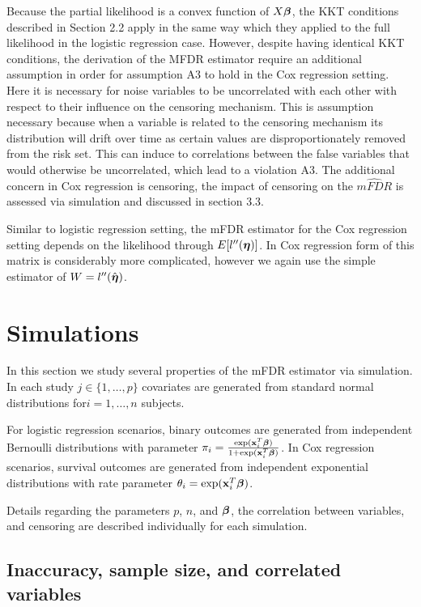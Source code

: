 Because the partial likelihood is a convex function of $X\boldsymbol{\beta}$, the KKT conditions described in Section 2.2 apply in the same way which they applied to the full likelihood in the logistic regression case. However, despite having identical KKT conditions, the derivation of the MFDR estimator require an additional assumption in order for assumption A3 to hold in the Cox regression setting.  Here it is necessary for noise variables to be uncorrelated with each other with respect to their influence on the censoring mechanism. This is assumption necessary because when a variable is related to the censoring mechanism its distribution will drift over time as certain values are disproportionately removed from the risk set. This can induce to correlations between the false variables that would otherwise be uncorrelated, which lead to a violation A3. The additional concern in Cox regression is censoring, the impact of censoring on the $\widehat{mFDR}$ is assessed via simulation and discussed in section 3.3. 

Similar to logistic regression setting, the mFDR estimator for the Cox regression setting depends on the likelihood through $E[l''(\boldsymbol{\eta})]$.  In Cox regression form of this matrix is considerably more complicated, however we again use the simple estimator of $W =  l''(\hat{\boldsymbol{\eta}})$.

\section{Simulations}

In this section we study several properties of the mFDR estimator via simulation. In each study $j \in \{1, \ldots, p\}$ covariates are generated from standard normal distributions for$i = 1, \ldots, n$ subjects. 

For logistic regression scenarios, binary outcomes are generated from independent Bernoulli distributions with parameter $\pi_i = \frac{\exp(\mathbf{x}_i^T \boldsymbol{\beta})} {1 + \exp(\mathbf{x}_i^T \boldsymbol{\beta})}$.  In Cox regression scenarios, survival outcomes are generated from independent exponential distributions with rate parameter $\theta_i = \exp(\mathbf{x}_i^T \boldsymbol{\beta})$.  

Details regarding the parameters $p$, $n$, and $\boldsymbol{\beta}$, the correlation between variables, and censoring are described individually for each simulation.

\subsection{Inaccuracy, sample size, and correlated variables}

